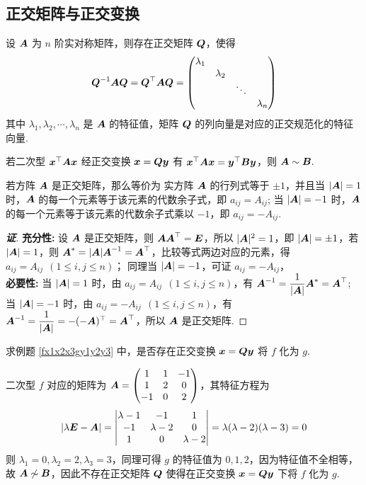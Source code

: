 \subsection{正交矩阵与正交变换}

\begin{definition}[正交矩阵]
    设 $\vb*{A}$ 为 $n$ 阶实对称矩阵，则存在正交矩阵 $\vb*{Q}$，使得
    $$\vb*{Q}^{-1}\vb*{AQ}=\vb*{Q}^\top\vb*{AQ}=\mqty(\dmat{\lambda_1,\lambda_2,\ddots,\lambda_n})$$
    其中 $\lambda_1,\lambda_2,\cdots,\lambda_n$ 是 $\vb*{A}$ 的特征值，矩阵 $\vb*{Q}$ 的列向量是对应的正交规范化的特征向量.
\end{definition}

\begin{theorem}[正交变换与相似]
    若二次型 $\vb*{x}^\top\vb*{Ax}$ 经正交变换 $\vb*{x}=\vb*{Qy}$ 有 $\vb*{x}^\top\vb*{Ax}=\vb*{y}^\top\vb*{By}$，则 $\vb*{A}\sim\vb*{B}.$
\end{theorem}

\begin{theorem}[正交矩阵的行列式]
    若方阵 $\vb*{A}$ 是正交矩阵，那么等价为 实方阵 $\vb*{A}$ 的行列式等于 $\pm1$，并且当 $|\vb*{A}|=1$ 时，$\vb*{A}$ 的每一个元素等于该元素的代数余子式，即 $a_{ij}=A_{ij}$;
    当 $|\vb*{A}|=-1$ 时，$\vb*{A}$ 的每一个元素等于该元素的代数余子式乘以 $-1$，即 $a_{ij}=-A_{ij}.$
\end{theorem}
\begin{proof}[{\songti \textbf{证}}]
    \textbf{充分性: }设 $\vb*{A}$ 是正交矩阵，则 $\vb*{AA}^\top=\vb*{E}$，所以 $|\vb*{A}|^2=1$，即 $|\vb*{A}|=\pm1$，若 $|\vb*{A}|=1$，则 $\vb*{A}^*=|\vb*{A}|\vb*{A}^{-1}=\vb*{A}^\top$，比较等式两边对应的元素，得 $a_{ij}=A_{ij}~~(1\leqslant i,j\leqslant n)$；
    同理当 $|\vb*{A}|=-1$，可证 $a_{ij}=-A_{ij}$，\\
    \textbf{必要性: }当 $|\vb*{A}|=1$ 时，由 $a_{ij}=A_{ij}~~(1\leqslant i,j\leqslant n)$，有 $\vb*{A}^{-1}=\dfrac{1}{|\vb*{A}|}\vb*{A}^*=\vb*{A}^\top$; 当 $|\vb*{A}|=-1$ 时，由 $a_{ij}=-A_{ij}~~(1\leqslant i,j\leqslant n)$，有 $\vb*{A}^{-1}=\dfrac{1}{|\vb*{A}|}=-(-\vb*{A})^\top=\vb*{A}^\top$，所以 $\vb*{A}$ 是正交矩阵.
\end{proof}

\begin{example}
    求例题 \ref{fx1x2x3gy1y2y3} 中，是否存在正交变换 $\vb*{x}=\vb*{Q}\vb*{y}$ 将 $f$ 化为 $g.$
\end{example}
\begin{solution}
    二次型 $f$ 对应的矩阵为 $\vb*{A}=\mqty(1&1&-1\\1&2&0\\-1&0&2)$，其特征方程为 $$|\lambda\vb*{E}-\vb*{A}|=\mqty|\lambda-1&-1&1\\-1&\lambda-2&0\\1&0&\lambda-2|=\lambda(\lambda-2)(\lambda-3)=0$$
    则 $\lambda_1=0,\lambda_2=2,\lambda_3=3$，同理可得 $g$ 的特征值为 $0,1,2$，因为特征值不全相等，故 $\vb*{A}\not\sim \vb*{B}$，因此不存在正交矩阵 $\vb*{Q}$ 使得在正交变换 $\vb*{x}=\vb*{Q}\vb*{y}$ 下将 $f$ 化为 $g.$
\end{solution}

